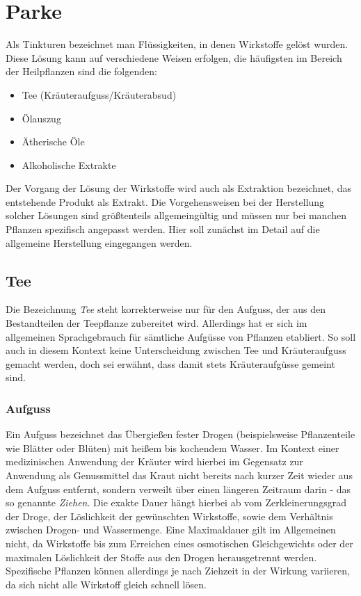 \chapter{Parke}

Als Tinkturen bezeichnet man Flüssigkeiten, in denen Wirkstoffe gelöst wurden. Diese Lösung kann auf verschiedene Weisen erfolgen, die häufigsten im Bereich der Heilpflanzen sind die folgenden:
\begin{itemize}
\item Tee (Kräuteraufguss/Kräuterabsud)
\item Ölauszug
\item Ätherische Öle
\item Alkoholische Extrakte
\end{itemize}

Der Vorgang der Lösung der Wirkstoffe wird auch als Extraktion bezeichnet, das entstehende Produkt als Extrakt. Die Vorgehensweisen bei der Herstellung solcher Lösungen sind größtenteils allgemeingültig und müssen nur bei manchen Pflanzen spezifisch angepasst werden. Hier soll zunächst im Detail auf die allgemeine Herstellung eingegangen werden.

\section{Tee}
Die Bezeichnung \textit{Tee} steht korrekterweise nur für den Aufguss, der aus den Bestandteilen der Teepflanze zubereitet wird. Allerdings hat er sich im allgemeinen Sprachgebrauch für sämtliche Aufgüsse von Pflanzen etabliert. So soll auch in diesem Kontext keine Unterscheidung zwischen Tee und Kräuteraufguss gemacht werden, doch sei erwähnt, dass damit stets Kräuteraufgüsse gemeint sind.

\subsection{Aufguss}
Ein Aufguss bezeichnet das Übergießen fester Drogen (beispielsweise Pflanzenteile wie Blätter oder Blüten) mit heißem bis kochendem Wasser. Im Kontext einer medizinischen Anwendung der Kräuter wird hierbei im Gegensatz zur Anwendung als Genussmittel das Kraut nicht bereits nach kurzer Zeit wieder aus dem Aufguss entfernt, sondern verweilt über einen längeren Zeitraum darin - das so genannte \textit{Ziehen}. Die exakte Dauer hängt hierbei ab vom Zerkleinerungsgrad der Droge, der Löslichkeit der gewünschten Wirkstoffe, sowie dem Verhältnis zwischen Drogen- und Wassermenge. Eine Maximaldauer gilt im Allgemeinen nicht, da Wirkstoffe bis zum Erreichen eines osmotischen Gleichgewichts oder der maximalen Löslichkeit der Stoffe aus den Drogen herausgetrennt werden. Spezifische Pflanzen können allerdings je nach Ziehzeit in der Wirkung variieren, da sich nicht alle Wirkstoff gleich schnell lösen.
